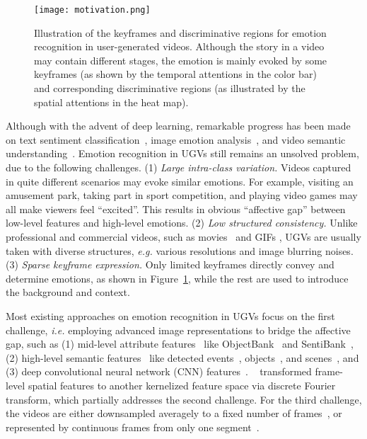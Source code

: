 \documentclass[letterpaper]{article} \usepackage{aaai20}  \usepackage{times}  \usepackage{helvet} \usepackage{courier}  \usepackage[hyphens]{url}  \usepackage{graphicx} \urlstyle{rm} \def\UrlFont{\rm}  \usepackage{graphicx}
\begin{document}
\begin{figure}[t]
   \centering
   \texttt{[image: motivation.png]}
   \caption{Illustration of the keyframes and discriminative regions for emotion recognition in user-generated videos. Although the story in a video may contain different stages, the emotion is mainly evoked by some keyframes (as shown by the temporal attentions in the color bar) and corresponding discriminative regions (as illustrated by the spatial attentions in the heat map).}
   \label{fig:problem}
\end{figure}



Although with the advent of deep learning, remarkable progress has been made on text sentiment classification~\cite{zhang2018deep}, image emotion analysis~\cite{zhao2018affective,zhao2018predicting,yang2018weakly}, and video semantic understanding~\cite{zhu2018towards,choutas2018potion}. Emotion recognition in UGVs still remains an unsolved problem, due to the following challenges. (1) \textit{Large intra-class variation.} Videos captured in quite different scenarios may evoke similar emotions. For example, visiting an amusement park, taking part in sport competition, and playing video games may all make viewers feel ``excited''. This results in obvious ``affective gap'' between low-level features and high-level emotions. (2) \textit{Low structured consistency.} Unlike professional and commercial videos, such as movies~\cite{wang2006affective} and GIFs \cite{jou2014predicting,yang2019human}, UGVs are usually taken with diverse structures, \textit{e.g.} various resolutions and image blurring noises. (3) \textit{Sparse keyframe expression.} Only limited keyframes directly convey and determine emotions, as shown in Figure~\ref{fig:problem}, while the rest are used to introduce the background and context.



Most existing approaches on emotion recognition in UGVs focus on the first challenge, \textit{i.e.} employing advanced image representations to bridge the affective gap, such as (1) mid-level attribute features~\cite{jiang2014predicting,tu2019multi} like ObjectBank~\cite{li2010object} and SentiBank~\cite{borth2013sentibank}, (2) high-level semantic features~\cite{chen2016emotion} like detected events~\cite{jiang2017exploiting,caba2015activitynet}, objects~\cite{deng2009imagenet}, and scenes~\cite{zhou2014learning}, and (3) deep convolutional neural network (CNN) features~\cite{xu2018heterogeneous,zhang2018recognition}. \citeauthor{zhang2018recognition}~ transformed frame-level spatial features to another kernelized feature space via discrete Fourier transform, which partially addresses the second challenge. For the third challenge, the videos are either downsampled averagely to a fixed number of frames~\cite{zhang2018recognition}, or represented by continuous frames from only one segment~\cite{tu2019multi}.
\end{document}

